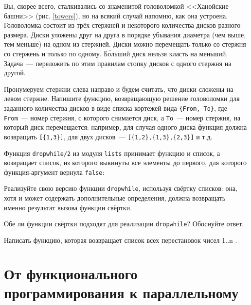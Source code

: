 \documentclass[
  paper=a4,
  fontsize=14pt,
  openany,
  appendixprefix=true
]{scrbook}
\begin{document}
\begin{problem}\label{hanoi}
Вы, скорее всего, сталкивались со знаменитой головоломкой <<Ханойские башни>> (рис. \ref{towers}), но на всякий случай напомню, как она устроена. Головоломка состоит из трёх стержней и некоторого количества дисков разного размера. Диски уложены друг на друга в порядке убывания диаметра (чем выше, тем меньше) на одном из стержней. Диски можно перемещать только со стержня со стержень и только по одному. Б\'{о}льший диск нельзя класть на меньший. Задача~--- переложить по этим правилам стопку дисков с одного стержня на другой.

Пронумеруем стержни слева направо и будем считать, что диски сложены на левом стержне. Напишите функцию, возвращающую решение головоломки для заданного количества дисков в виде списка кортежей вида \lstinline!{From, To}!, где \lstinline{From}~--- номер стержня, с которого снимается диск, а \lstinline{To}~--- номер стержня, на который диск перемещается: например, для случая одного диска функция должна возвращать \lstinline![{1,3}]!, для двух дисков~--- \lstinline![{1,2},{1,3},{2,3}]! и т.д.
\end{problem}

\begin{problem}\label{dropwhile}
\complicated Функция \lstinline{dropwhile/2} из модуля \lstinline{lists} принимает функцию и список, а возвращает список, из которого выкинуты все элементы до первого, для которого функция-аргумент вернула \lstinline{false}:



Реализуйте свою версию функции \lstinline{dropwhile}, используя свёртку списков: она, хотя и может содержать дополнительные определения, должна возвращать именно результат вызова функции свёртки.

Обе ли функции свёртки подходят для реализации \lstinline{dropwhile}? Обоснуйте ответ.
\end{problem}

\begin{problem}\label{permutations}
\complicated Написать функцию,  которая возвращает список всех перестановок чисел 1..n \cite[7.3.2]{shen}.
\end{problem}

\chapter{От функционального программирования к параллельному}
\end{document}
